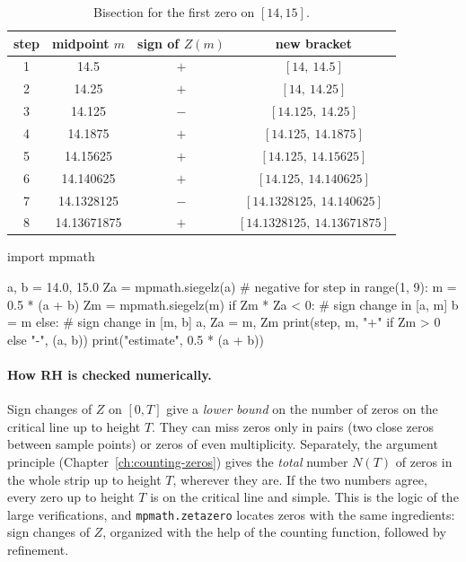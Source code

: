 \begin{table}[htbp]\centering
\caption{Bisection for the first zero on $[14,15]$.}
\label{tab:zeta-bisect}
\begin{tabular}{cccc}
\toprule
step & midpoint $m$ & sign of $Z(m)$ & new bracket\\
\midrule
1 & 14.5 & $+$ & $[14,\ 14.5]$\\
2 & 14.25 & $+$ & $[14,\ 14.25]$\\
3 & 14.125 & $-$ & $[14.125,\ 14.25]$\\
4 & 14.1875 & $+$ & $[14.125,\ 14.1875]$\\
5 & 14.15625 & $+$ & $[14.125,\ 14.15625]$\\
6 & 14.140625 & $+$ & $[14.125,\ 14.140625]$\\
7 & 14.1328125 & $-$ & $[14.1328125,\ 14.140625]$\\
8 & 14.13671875 & $+$ & $[14.1328125,\ 14.13671875]$\\
\bottomrule
\end{tabular}
\end{table}

\begin{pycode}
import mpmath

a, b = 14.0, 15.0
Za = mpmath.siegelz(a)                 # negative
for step in range(1, 9):
    m = 0.5 * (a + b)
    Zm = mpmath.siegelz(m)
    if Zm * Za < 0:                    # sign change in [a, m]
        b = m
    else:                              # sign change in [m, b]
        a, Za = m, Zm
    print(step, m, "+" if Zm > 0 else "-", (a, b))
print("estimate", 0.5 * (a + b))
\end{pycode}

\paragraph{How RH is checked numerically.} Sign changes of $Z$ on $[0,T]$ give a \emph{lower bound} on the number of zeros on the critical line up to height $T$. They can miss zeros only in pairs (two close zeros between sample points) or zeros of even multiplicity. Separately, the argument principle (Chapter~\ref{ch:counting-zeros}) gives the \emph{total} number $N(T)$ of zeros in the whole strip up to height $T$, wherever they are. If the two numbers agree, every zero up to height $T$ is on the critical line and simple. This is the logic of the large verifications, and \texttt{mpmath.zetazero} locates zeros with the same ingredients: sign changes of $Z$, organized with the help of the counting function, followed by refinement.

